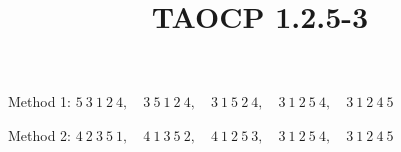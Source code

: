 \documentclass{article}
\title{TAOCP 1.2.5\mbox{-}3}
\begin{document}
\maketitle

Method 1: \( 5\ 3\ 1\ 2\ 4,\quad 3\ 5\ 1\ 2\ 4,\quad 3\ 1\ 5\ 2\ 4,\quad 3\ 1\ 2\ 5\ 4,\quad 3\ 1\ 2\ 4\ 5 \)

Method 2: \( 4\ 2\ 3\ 5\ 1,\quad 4\ 1\ 3\ 5\ 2,\quad 4\ 1\ 2\ 5\ 3,\quad 3\ 1\ 2\ 5\ 4,\quad 3\ 1\ 2\ 4\ 5 \)
\end{document}
